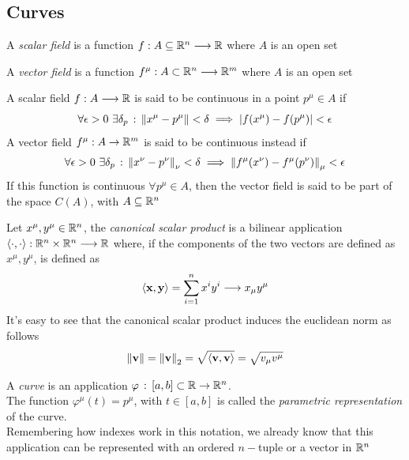 \documentclass[../complete.tex]{subfiles}
\begin{document}
\subsection{Curves}
\begin{dfn}
	A \textit{scalar field} is a function $f:A\subseteq\R^n\fto\R$ where $A$ is an open set
\end{dfn}
\begin{dfn}
	A \textit{vector field} is a function $f^\mu:A\subset\R^n\fto\R^m$ where $A$ is an open set
\end{dfn}
\begin{dfn}[Continuity]
	A scalar field $f:A\fto\R$ is said to be continuous in a point $p^\mu\in A$ if
	\begin{equation}
		\forall\epsilon>0\ \exists\delta_p\st\norm{x^\mu-p^\mu}<\delta\implies{}\abs{f(x^\mu)-f(p^\mu)}<\epsilon
		\label{eq:scalarfieldcont}
	\end{equation}
	A vector field $f^\mu:A\to\R^m$ is said to be continuous instead if
	\begin{equation}
		\forall\epsilon>0\ \exists\delta_{p}\st\norm{x^\nu-p^\nu}_\nu<\delta\implies{}\norm{f^\mu(x^\nu)-f^\mu(p^\nu)}_\mu<\epsilon
		\label{eq:vecfieldcont}
	\end{equation}
	If this function is continuous $\forall p^\mu\in A$, then the vector field is said to be part of the space $C(A)$, with $A\subseteq\R^n$
\end{dfn}
\begin{dfn}
	Let $x^\mu,y^\mu\in\R^n$, the \textit{canonical scalar product} is a bilinear application $\spr{\cdot}{\cdot}:\R^n\times\R^n\fto\R$ where, if the components of the two vectors are defined as $x^\mu,y^\mu$, is defined as
	\begin{equation}
		\spr{\vec{x}}{\vec{y}}=\sum_{i=1}^nx^iy^i\fto x_\mu y^\mu
		\label{eq:scalarprod}
	\end{equation}
	It's easy to see that the canonical scalar product induces the euclidean norm as follows
	\begin{equation}
		\norm{\vec{v}}=\pnorm[2]{\vec{v}}=\sqrt{\spr{\vec{v}}{\vec{v}}}=\sqrt{v_\mu v^\mu}
		\label{eq:euclideannorm}
	\end{equation}
\end{dfn}
\begin{dfn}[Curves in $\R^n$]
	A \textit{curve} is an application $\varphi\st[a,b]\subset\R\to\R^n$.\\
	The function $\varphi^\mu(t)=p^\mu$, with $t\in[a,b]$ is called the \textit{parametric representation} of the curve.\\
	Remembering how indexes work in this notation, we already know that this application can be represented with an ordered $n-$tuple or a vector in $\R^n$
\end{dfn}
\end{document}

